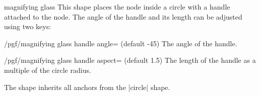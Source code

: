 \begin{shape}{magnifying glass}
    This shape places the node inside a circle with a handle attached to the
    node. The angle of the handle and its length can be adjusted using two
    keys:

    \begin{key}{/pgf/magnifying glass handle angle= (default -45)}
        The angle of the handle.
    \end{key}

    \begin{key}{/pgf/magnifying glass handle aspect= (default 1.5)}
        The length of the handle as a multiple of the circle radius.
    \end{key}
\begin{codeexample}[preamble={\usetikzlibrary{shapes.symbols}}]
\end{codeexample}
    The shape inherits all anchors from the |circle| shape.
\end{shape}

